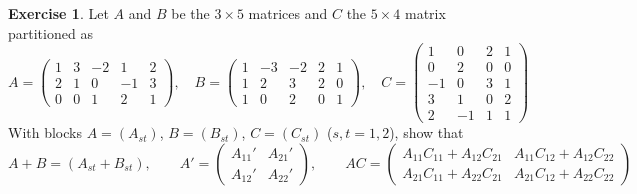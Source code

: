\documentclass[12pt]{article}
\theoremstyle{definition}
\newtheorem{exercise}{Exercise}
\begin{document}
\begin{exercise}\label{r5b-ex-partitioned}
Let \(A\) and \(B\) be the \(3\times5\) matrices and \(C\) the \(5\times4\) matrix partitioned
as
\[
A=\left(\begin{array}{ccc|cc}1&3&-2&1&2\\2&1&0&-1&3\\\hline0&0&1&2&1\end{array}\right),\quad
B=\left(\begin{array}{ccc|cc}1&-3&-2&2&1\\1&2&3&2&0\\\hline1&0&2&0&1\end{array}\right),\quad
C=\left(\begin{array}{cc|cc}1&0&2&1\\0&2&0&0\\-1&0&3&1\\\hline3&1&0&2\\2&-1&1&1\end{array}\right)
\]
With blocks \(A=(A_{st})\), \(B=(B_{st})\), \(C=(C_{st})\) (\(s,t=1,2\)), show that
\[
A+B=(A_{st}+B_{st}),\qquad
A'=\begin{pmatrix}A_{11}'&A_{21}'\\A_{12}'&A_{22}'\end{pmatrix},\qquad
AC=\begin{pmatrix}A_{11}C_{11}+A_{12}C_{21}&A_{11}C_{12}+A_{12}C_{22}\\A_{21}C_{11}+A_{22}C_{21}&A_{21}C_{12}+A_{22}C_{22}\end{pmatrix}
\]
\end{exercise}
\end{document}
